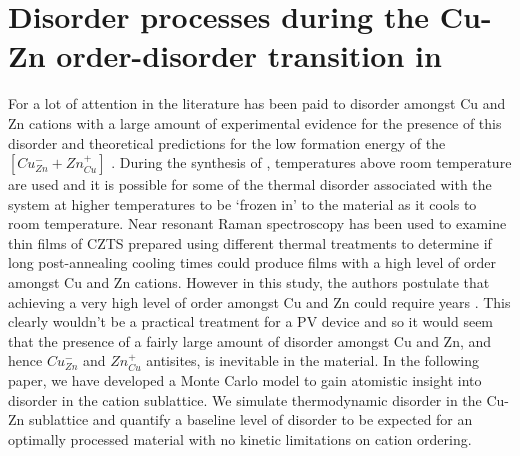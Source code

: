 \documentclass[11pt, twoside]{report}
\begin{document}
\section{Disorder processes during the Cu-Zn order-disorder transition in {\CZTS}}\label{CZTS_MC}
For {\CZTS} a lot of attention in the literature has been paid to disorder amongst Cu and Zn cations with a large amount of experimental evidence for the presence of this disorder \cite{Schorr, CZTS_Xray, CZTS_TEM} and theoretical predictions for the low formation energy of the  $[Cu_{Zn}^{-} + Zn_{Cu}^{+}]$ \cite{defects_Chen}.
During the synthesis of {\CZTS}, temperatures above room temperature are used and it is possible for some of the thermal disorder associated with the system at higher temperatures to be `frozen in' to the material as it cools to room temperature.
Near resonant Raman spectroscopy has been used to examine thin films of CZTS prepared using different thermal treatments to determine if long post-annealing cooling times could produce films with a high level of order amongst Cu and Zn cations. However in this study, the authors postulate that achieving a very high level of order amongst Cu and Zn could require years \cite{Katharina}. This clearly wouldn't be a practical treatment for a PV device and so it would seem that the presence of a fairly large amount of disorder amongst Cu and Zn, and hence $Cu_{Zn}^{-}$ and $Zn_{Cu}^{+}$ antisites,  is inevitable in the material. In the following paper, we have developed a Monte Carlo model to gain atomistic insight into disorder in the cation sublattice. We simulate thermodynamic disorder in the Cu-Zn sublattice and quantify a baseline level of disorder to be expected for an optimally processed material with no kinetic limitations on cation ordering.
\end{document}
